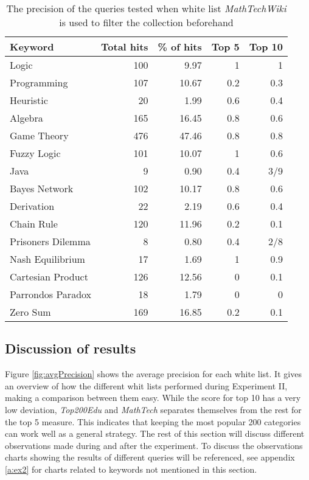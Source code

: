 \begin{table}[h]
\centering
\small
\begin{tabular} {|| p{10em} | r | r | r | r ||} 
 \hline
 Keyword & Total hits & \% of hits & Top 5 & Top 10 \\ [0.5ex] 
 \hline

Logic & 100 & 9.97 & 1 & 1 \\
Programming & 107 & 10.67 & 0.2 & 0.3 \\
Heuristic & 20 & 1.99 & 0.6 & 0.4 \\
Algebra & 165 & 16.45 & 0.8 & 0.6 \\
Game Theory & 476 & 47.46 & 0.8 & 0.8 \\
\hline
Fuzzy Logic & 101 & 10.07 & 1 & 0.6 \\
Java & 9 & 0.90 & 0.4 & 3/9 \\
Bayes Network & 102 & 10.17 & 0.8 & 0.6 \\
Derivation & 22 & 2.19 & 0.6 & 0.4 \\
\hline
Chain Rule & 120 & 11.96 & 0.2 & 0.1 \\
Prisoners Dilemma & 8 & 0.80 & 0.4 & 2/8 \\
Nash Equilibrium & 17 & 1.69 & 1 & 0.9 \\
Cartesian Product & 126 & 12.56 & 0 & 0.1 \\
Parrondos Paradox & 18 & 1.79 & 0 & 0 \\
Zero Sum & 169 & 16.85 & 0.2 & 0.1 \\

 \hline
\end{tabular}
\caption{The precision of the queries tested when white list \textit{MathTechWiki} is used to filter the collection beforehand}
\label{table:p_test_list4}
\end{table}
\clearpage



\subsection{Discussion of results}



Figure \ref{fig:avgPrecision} shows the average precision for each white list. It gives an overview of how the different whit lists performed during Experiment II, making a comparison between them easy. While the score for top 10 has a very low deviation, \textit{Top200Edu} and \textit{MathTech} separates themselves from the rest for the top 5 measure. This indicates that keeping the most popular 200 categories can work well as a general strategy. The rest of this section will discuss different observations made during and after the experiment. To discuss the observations charts showing the results of different queries will be referenced, see appendix \ref{a:ex2} for charts related to keywords not mentioned in this section.

